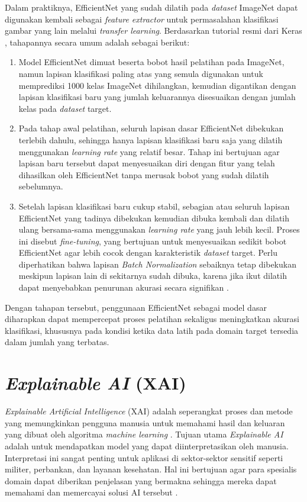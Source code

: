 Dalam praktiknya, EfficientNet yang sudah dilatih pada \textit{dataset} ImageNet dapat digunakan kembali sebagai \textit{feature extractor} untuk permasalahan klasifikasi gambar yang lain melalui \textit{transfer learning}. Berdasarkan tutorial resmi dari Keras \cite{keras2020efficientnet}, tahapannya secara umum adalah sebagai berikut:
\begin{enumerate}
	\item Model EfficientNet dimuat beserta bobot hasil pelatihan pada ImageNet, namun lapisan klasifikasi paling atas yang semula digunakan untuk memprediksi 1000 kelas ImageNet dihilangkan, kemudian digantikan dengan lapisan klasifikasi baru yang jumlah keluarannya disesuaikan dengan jumlah kelas pada \textit{dataset} target.
	\item Pada tahap awal pelatihan, seluruh lapisan dasar EfficientNet dibekukan terlebih dahulu, sehingga hanya lapisan klasifikasi baru saja yang dilatih menggunakan \textit{learning rate} yang relatif besar. Tahap ini bertujuan agar lapisan baru tersebut dapat menyesuaikan diri dengan fitur yang telah dihasilkan oleh EfficientNet tanpa merusak bobot yang sudah dilatih sebelumnya.
	\item Setelah lapisan klasifikasi baru cukup stabil, sebagian atau seluruh lapisan EfficientNet yang tadinya dibekukan kemudian dibuka kembali dan dilatih ulang bersama-sama menggunakan \textit{learning rate} yang jauh lebih kecil. Proses ini disebut \textit{fine-tuning}, yang bertujuan untuk menyesuaikan sedikit bobot EfficientNet agar lebih cocok dengan karakteristik \textit{dataset} target. Perlu diperhatikan bahwa lapisan \textit{Batch Normalization} sebaiknya tetap dibekukan meskipun lapisan lain di sekitarnya sudah dibuka, karena jika ikut dilatih dapat menyebabkan penurunan akurasi secara signifikan \cite{keras2020efficientnet}.
\end{enumerate}
Dengan tahapan tersebut, penggunaan EfficientNet sebagai model dasar diharapkan dapat mempercepat proses pelatihan sekaligus meningkatkan akurasi klasifikasi, khususnya pada kondisi ketika data latih pada domain target tersedia dalam jumlah yang terbatas.

\section{\textit{Explainable AI} (XAI)}
\textit{Explainable Artificial Intelligence} (XAI) adalah seperangkat proses dan metode yang memungkinkan pengguna manusia untuk memahami hasil dan keluaran yang dibuat oleh algoritma \textit{machine learning} \autocite{ibm2023xai}. Tujuan utama \textit{Explainable AI} adalah untuk mendapatkan model yang dapat diinterpretasikan oleh manusia. Interpretasi ini sangat penting untuk aplikasi di sektor-sektor sensitif seperti militer, perbankan, dan layanan kesehatan. Hal ini bertujuan agar para spesialis domain dapat diberikan penjelasan yang bermakna sehingga mereka dapat memahami dan memercayai solusi AI tersebut \autocite{ali2023explainable}.

